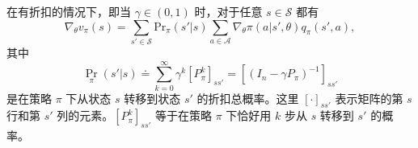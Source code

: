 \begin{lemma}[状态值的梯度]
\label{lem:rl-pg-grad-v}
在有折扣的情况下，即当 $\gamma \in (0,1)$ 时，对于任意 $s \in \mathcal{S}$ 都有
\begin{equation}
\nabla_{\theta} v_{\pi}(s) = \sum_{s' \in \mathcal{S}} \mathrm{Pr}_{\pi}(s'|s) \sum_{a \in \mathcal{A}} \nabla_{\theta} \pi(a|s',\theta) q_{\pi}(s',a),
\label{eq:rl-pg-grad-v}
\end{equation}
其中
\begin{equation}
\operatorname*{Pr}_{\pi}(s'|s) \doteq \sum_{k=0}^{\infty} \gamma^{k} [P_{\pi}^{k}]_{ss'} = \left[(I_n - \gamma P_{\pi})^{-1}\right]_{ss'}
\end{equation}
是在策略 $\pi$ 下从状态 $s$ 转移到状态 $s'$ 的折扣总概率。这里 $[\cdot]_{ss'}$ 表示矩阵的第 $s$ 行和第 $s'$ 列的元素。$[P_{\pi}^{k}]_{ss'}$ 等于在策略 $\pi$ 下恰好用 $k$ 步从 $s$ 转移到 $s'$ 的概率。
\end{lemma}

